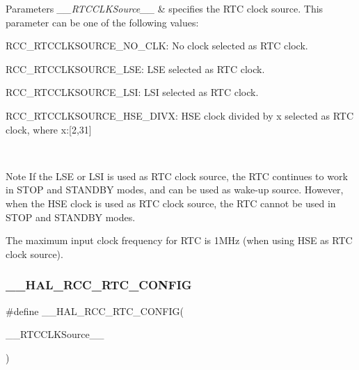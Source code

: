 \begin{DoxyParams}{Parameters}
{\em \+\_\+\+\_\+\+R\+T\+C\+C\+L\+K\+Source\+\_\+\+\_\+} & specifies the R\+TC clock source. This parameter can be one of the following values\+: \begin{DoxyItemize}
\item R\+C\+C\+\_\+\+R\+T\+C\+C\+L\+K\+S\+O\+U\+R\+C\+E\+\_\+\+N\+O\+\_\+\+C\+L\+K\+: No clock selected as R\+TC clock. \item R\+C\+C\+\_\+\+R\+T\+C\+C\+L\+K\+S\+O\+U\+R\+C\+E\+\_\+\+L\+S\+E\+: L\+SE selected as R\+TC clock. \item R\+C\+C\+\_\+\+R\+T\+C\+C\+L\+K\+S\+O\+U\+R\+C\+E\+\_\+\+L\+S\+I\+: L\+SI selected as R\+TC clock. \item R\+C\+C\+\_\+\+R\+T\+C\+C\+L\+K\+S\+O\+U\+R\+C\+E\+\_\+\+H\+S\+E\+\_\+\+D\+I\+V\+X\+: H\+SE clock divided by x selected as R\+TC clock, where x\+:\mbox{[}2,31\mbox{]} \end{DoxyItemize}
\\
\hline
\end{DoxyParams}
\begin{DoxyNote}{Note}
If the L\+SE or L\+SI is used as R\+TC clock source, the R\+TC continues to work in S\+T\+OP and S\+T\+A\+N\+D\+BY modes, and can be used as wake-\/up source. However, when the H\+SE clock is used as R\+TC clock source, the R\+TC cannot be used in S\+T\+OP and S\+T\+A\+N\+D\+BY modes. 

The maximum input clock frequency for R\+TC is 1\+M\+Hz (when using H\+SE as R\+TC clock source). 
\end{DoxyNote}
\mbox{\label{group___r_c_c___internal___r_t_c___clock___configuration_ga2b1e5349631886f29040d7a31c002718}} 
\subsubsection{\texorpdfstring{\+\_\+\+\_\+\+H\+A\+L\+\_\+\+R\+C\+C\+\_\+\+R\+T\+C\+\_\+\+C\+O\+N\+F\+IG}{\_\_HAL\_RCC\_RTC\_CONFIG}}
{\footnotesize\ttfamily \#define \+\_\+\+\_\+\+H\+A\+L\+\_\+\+R\+C\+C\+\_\+\+R\+T\+C\+\_\+\+C\+O\+N\+F\+IG(\begin{DoxyParamCaption}\item[{}]{\+\_\+\+\_\+\+R\+T\+C\+C\+L\+K\+Source\+\_\+\+\_\+ }\end{DoxyParamCaption})}

